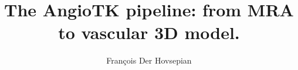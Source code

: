 \documentclass{beamer}
\title{The AngioTK pipeline: from MRA to vascular 3D model.}
\author{François Der Hovsepian}
\newcommand{\chpath}{}
\begin{document}
\begin{frame}
\titlepage
\end{frame}

\renewcommand{\chpath}{0-overview/}

\end{document}
